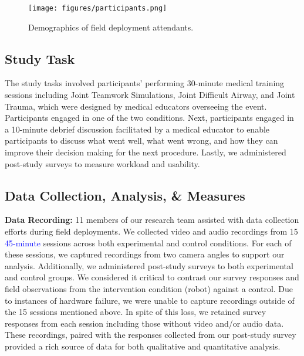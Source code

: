 \begin{figure}[t]
    \centering
 \texttt{[image: figures/participants.png]}
    \caption{Demographics of field deployment attendants.} 
    \label{fig:participants}
\end{figure}



\subsection{Study Task} 

The study tasks involved participants’ performing 30-minute medical training sessions including Joint Teamwork Simulations, Joint Difficult Airway, and Joint Trauma, which were designed by medical educators overseeing the event.
Participants engaged in one of the two conditions.
Next, participants engaged in a 10-minute debrief discussion facilitated by a medical educator to enable participants to discuss what went well, what went wrong, and how they can improve their decision making for the next procedure.
Lastly, we administered post-study surveys to measure workload and usability.

\begin{comment}
\begin{figure}[t] 
	\centering 
	\texttt{[image: figures/nasa\_tlx\_comparison\_v7.png]} 
	\caption{Control and robot groups NASA-TLX \cite{hart2006nasa} scores.}%
	\label{fig:robot-sus-nasa} 
\end{figure}
\end{comment}

\subsection{Data Collection, Analysis, \& Measures} 

\textbf{Data Recording:} 11 members of our research team assisted with data collection efforts during field deployments. We collected video and audio recordings from 15 \textcolor{blue} {45-minute} sessions across both experimental and control conditions. For each of these sessions, we captured recordings from two camera angles to support our analysis. Additionally, we administered post-study surveys to both experimental and control groups. We considered it critical to contrast our survey responses and field observations from the intervention condition (robot) against a control. Due to instances of hardware failure, we were unable to capture recordings outside of the 15 sessions mentioned above. In spite of this loss, we retained survey responses from each session including those without video and/or audio data. These recordings, paired with the responses collected from our post-study survey provided a rich source of data for both qualitative and quantitative analysis. 

